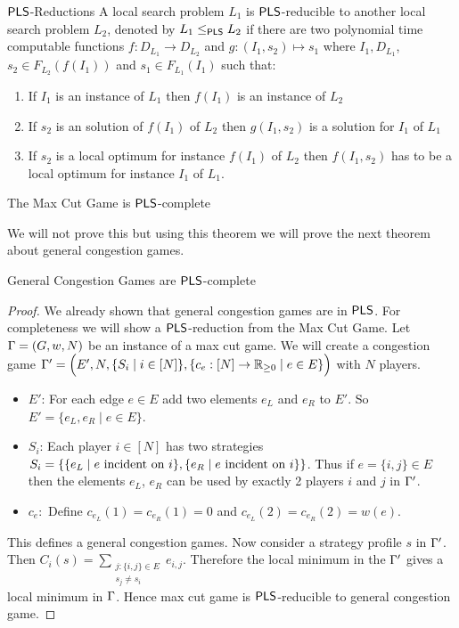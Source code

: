 \begin{Definition}{$\operatorname{\mathsf{PLS}}$-Reductions}{}
	A local search problem $L_1$ is $\operatorname{\mathsf{PLS}}$-reducible to another local search problem $L_2$, denoted by $L_1\leq_{\operatorname{\mathsf{PLS}}}L_2$ if there are two polynomial time computable functions $f:D_{L_1}\to D_{L_2}$ and $g:(I_1,s_2)\mapsto s_1$ where $I_1, D_{L_1}$, $s_2\in F_{L_2}(f(I_1))$ and $s_1\in F_{L_1}(I_1)$ such that:\begin{enumerate}[label=(\roman*)]
		\item If $I_1$ is an instance of $L_1$ then $f(I_1)$ is an instance of $L_2$
		\item If $s_2$ is an solution of $f(I_1)$ of $L_2$ then $g(I_1,s_2)$ is a solution for $I_1$ of $L_1$
		\item If $s_2$ is a local optimum for instance $f(I_1)$ of $L_2$ then $f(I_1,s_2)$ has to be a local optimum for instance $I_1$ of $L_1$.
	\end{enumerate}
\end{Definition}
\begin{Theorem}{}{}
	The Max Cut Game is $\operatorname{\mathsf{PLS}}$-complete
\end{Theorem}

We will not prove this but using this theorem we will prove the next theorem about general congestion games.

\begin{Theorem}{}{}
	General Congestion Games are $\operatorname{\mathsf{PLS}}$-complete
\end{Theorem}
\begin{proof}
	We already shown that general congestion games are in $\operatorname{\mathsf{PLS}}$. For completeness we will show a $\operatorname{\mathsf{PLS}}$-reduction from the Max Cut Game. Let $\Gamma=(G,w,N)$ be an instance of a max cut game. We will create a congestion game $\Gamma'=\Big(E',N, \{S_i\mid i\in[N]\}, \{c_e:[N]\to \mathbb{R}_{\geq 0}\mid e\in E\}\Big)$ with $N$ players.
	
	\begin{itemize}
		\item $E'$: For each edge $e\in E$ add two elements $e_L$ and $e_R$ to $E'$. So $E'=\{e_L,e_R\mid e\in E\}$.
		\item $S_i$: Each player $i\in[N]$ has two strategies $S_i=\left\{\{e_L\mid e\text{ incident on $i$}\}, \{e_R\mid e\text{ incident on $i$}\}\right\}$. Thus if $e=\{i,j\}\in E$ then the elements $e_L$, $e_R$ can be used by exactly 2 players $i$ and $j$ in $\Gamma'$.
		\item $c_e:$ Define $c_{e_L}(1)=c_{e_R}(1)=0$ and $c_{e_L}(2)=c_{e_R}(2)=w(e)$.
	\end{itemize}
This defines a general congestion games. Now consider a strategy profile $s$ in $\Gamma'$. Then $C_i(s)=\sum\limits_{\substack{j:\{i,j\}\in E\\ s_j\neq s_i}}e_{i,j}$. Therefore the local minimum in the $\Gamma'$ gives a local minimum in $\Gamma$. Hence max cut game is $\operatorname{\mathsf{PLS}}$-reducible to general congestion game.
\end{proof}